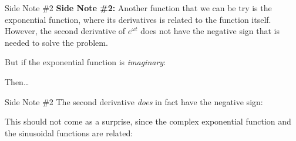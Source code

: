 \documentclass[12pt,compress,aspectratio=169]{beamer}
\begin{document}
\begin{frame}{Side Note \#2}
  \textbf{Side Note \#2:} Another function that we can be try is the
  exponential function, where its derivatives is related to the function
  itself. However, the second derivative of $e^{\omega t}$ does not have the
  negative sign that is needed to solve the problem.


  But if the exponential function is \emph{imaginary}:


  \vspace{-.1in}Then\ldots
\end{frame}



\begin{frame}{Side Note \#2}
  The second derivative \emph{does} in fact have the negative sign:

  
  This should not come as a surprise, since the complex exponential function
  and the sinusoidal functions are related:

\end{frame}
\end{document}
